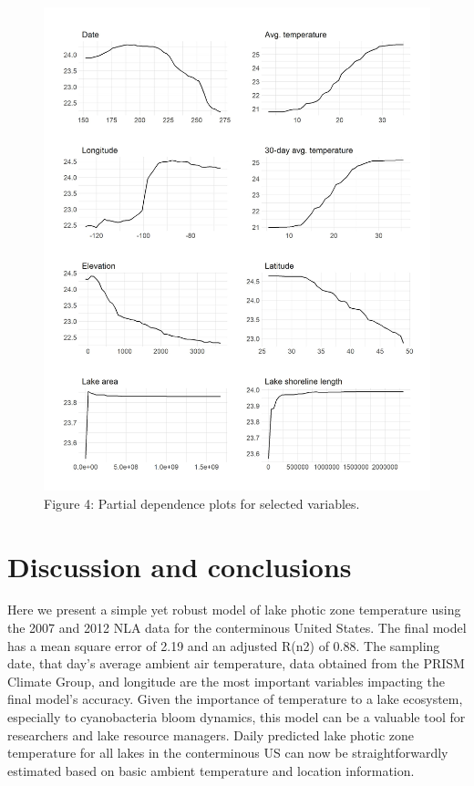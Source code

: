 \documentclass[
]{article}
\begin{document}
\begin{figure}
\centering
\includegraphics{../figures/partPlot.jpg}
\caption{Figure 4: Partial dependence plots for selected variables.}
\end{figure}

\hypertarget{discussion-and-conclusions}{%
\section{Discussion and conclusions}\label{discussion-and-conclusions}}

Here we present a simple yet robust model of lake photic zone
temperature using the 2007 and 2012 NLA data for the conterminous United
States. The final model has a mean square error of 2.19 and an adjusted
R(n2) of 0.88. The sampling date, that day's average ambient air
temperature, data obtained from the PRISM Climate Group, and longitude
are the most important variables impacting the final model's accuracy.
Given the importance of temperature to a lake ecosystem, especially to
cyanobacteria bloom dynamics, this model can be a valuable tool for
researchers and lake resource managers. Daily predicted lake photic zone
temperature for all lakes in the conterminous US can now be
straightforwardly estimated based on basic ambient temperature and
location information.
\end{document}
